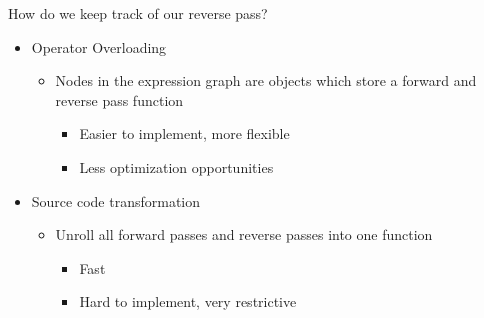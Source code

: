 \documentclass[dvipsnames, aspectratio=169]{beamer}
\begin{document}
\begin{frame}{How do we keep track of our reverse pass?}
\begin{itemize}
    \item[] Operator Overloading
    \begin{itemize}
        \item[-] Nodes in the expression graph are objects which store a forward and reverse pass function
        \begin{itemize}
          \item[Good:] Easier to implement, more flexible
          \item[Bad:] Less optimization opportunities
        \end{itemize}
    \end{itemize}
  \item[] Source code transformation
    \begin{itemize}
        \item[-] Unroll all forward passes and reverse passes into one function
        \begin{itemize}
            \item[Good:] Fast
            \item[Bad:] Hard to implement, very restrictive
        \end{itemize}
    \end{itemize}
\end{itemize}
\end{frame}

\end{document}
